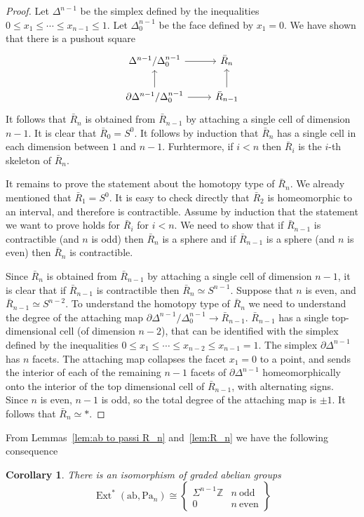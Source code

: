 \documentclass[psamsfonts]{amsart}
\theoremstyle{plain}
\newtheorem{cor}[thm]{Corollary}
\theoremstyle{definition}
\theoremstyle{remark}
\newcommand{\Z}{\mathbb{Z}}
\newcommand{\abelianization}{\mathrm{ab}}
\newcommand{\Passi}{\mathrm{Pa}}
\DeclareMathOperator{\ext}{Ext}
\begin{document}
\begin{proof}
Let $\Delta^{n-1}$ be the simplex defined by the inequalities $0\le x_1\le \cdots \le x_{n-1}\le 1$. Let $\Delta^{n-1}_0$ be the face defined by $x_1=0$. We have shown that there is a pushout square
\[\begin{tikzcd}
	\Delta^{n-1}/\Delta^{n-1}_0 & {\bar R_n} \\
	{\partial\Delta^{n-1}/\Delta^{n-1}_0} & {\bar R_{n-1}}
	\arrow[from=1-1, to=1-2]
	\arrow[from=2-1, to=1-1]
	\arrow[from=2-1, to=2-2]
	\arrow[from=2-2, to=1-2]
\end{tikzcd}\]
It follows that $\bar R_n$ is obtained from $\bar R_{n-1}$ by attaching a single cell of dimension $n-1$. It is clear that $\bar R_0=S^0$. It follows by induction that $\bar R_n$ has a single cell in each dimension between $1$ and $n-1$. Furhtermore, if $i<n$ then $\bar R_i$ is the $i$-th skeleton of $\bar R_n$.

It remains to prove the statement about the homotopy type of $\bar R_n$. We already mentioned that $\bar R_1=S^0$. It is easy to check directly that $\bar R_2$ is homeomorphic to an interval, and therefore is contractible. Assume by induction that the statement we want to prove holds for $\bar R_i$ for $i<n$. We need to show that if $\bar R_{n-1}$ is contractible (and $n$ is odd) then $\bar R_n$ is a sphere and if $\bar R_{n-1}$ is a sphere (and $n$ is even) then $\bar R_n$ is contractible.

Since $\bar R_n$ is obtained from $\bar R_{n-1}$ by attaching a single cell of dimension $n-1$, it is clear that if $\bar R_{n-1}$ is contractible then $\bar R_n\simeq S^{n-1}$. Suppose that $n$ is even, and $\bar R_{n-1}\simeq S^{n-2}$. To understand the homotopy type of $\bar R_n$ we need to understand the degree of the attaching map $\partial\Delta^{n-1}/\Delta^{n-1}_0\to \bar R_{n-1}$. $\bar R_{n-1}$ has a single top-dimensional cell (of dimension $n-2$), that can be identified with the simplex defined by the inequalities $0\le x_1\le \cdots \le x_{n-2} \le x_{n-1}=1$. The simplex $\partial \Delta^{n-1}$ has $n$ facets. The attaching map collapses the facet $x_1=0$ to a point, and sends the interior of each of the remaining $n-1$ facets of $\partial \Delta^{n-1}$ homeomorphically onto the interior of the top dimensional cell of $\bar R_{n-1}$, with alternating signs. Since $n$ is even, $n-1$ is odd, so the total degree of the attaching map is $\pm 1$. It follows that  $\bar R_n\simeq *$.
\end{proof}
From Lemmas~\ref{lem:ab to passi R_n} and~\ref{lem:R_n} we have the following consequence
\begin{cor}\label{cor:ab to passi}
There is an isomorphism of graded abelian groups
\[
\ext^*(\abelianization, \Passi_n)\cong \left\{\begin{array}{cl}
  \Sigma^{n-1}\Z   & n \ \mathrm{ odd}  \\
   0  &  n \ \mathrm{ even}
\end{array}\right\}
\]
\end{cor}
\end{document}
